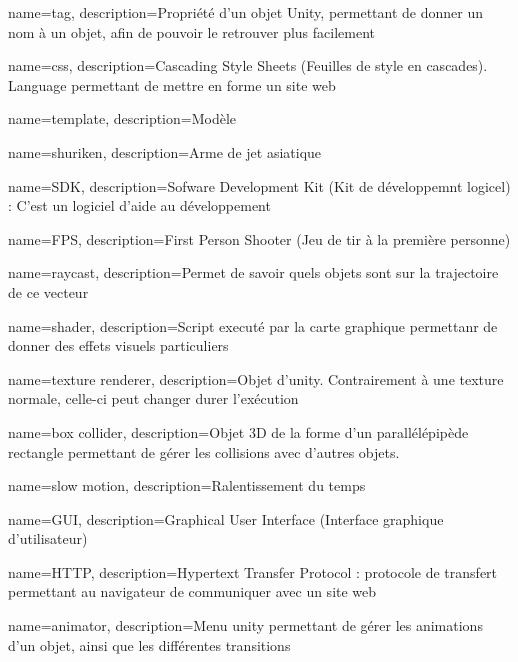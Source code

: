 {
  name=tag,
  description={Propriété d'un objet Unity, permettant de donner un nom à un objet, afin de pouvoir le retrouver plus facilement}
}

{
  name=css,
  description={Cascading Style Sheets (Feuilles de style en cascades). Language permettant de mettre en forme un site web}
}

{
  name=template,
  description={Modèle}
}

{
  name=shuriken,
  description={Arme de jet asiatique}
}

{
  name=SDK,
  description={Sofware Development Kit (Kit de développemnt logicel) : C'est un logiciel d'aide au développement}
}

{
  name=FPS,
  description={First Person Shooter (Jeu de tir à la première personne)}
}

{
  name=raycast,
  description={Permet de savoir quels objets sont sur la trajectoire de ce vecteur}
}

{
  name=shader,
  description={Script executé par la carte graphique permettanr de donner des effets visuels particuliers}
}

{
  name=texture renderer,
  description={Objet d'unity. Contrairement à une texture normale, celle-ci peut changer durer l'exécution}
}

{
  name=box collider,
  description={Objet 3D de la forme d'un parallélépipède rectangle permettant de gérer les collisions avec d'autres objets.}
}

{
  name=slow motion,
  description={Ralentissement du temps}
}

{
  name=GUI,
  description={Graphical User Interface (Interface graphique d'utilisateur)}
}

{
  name=HTTP,
  description={Hypertext Transfer Protocol : protocole de transfert permettant au navigateur de communiquer avec un site web}
}

{
  name=animator,
  description={Menu unity permettant de gérer les animations d'un objet, ainsi que les différentes transitions}
}